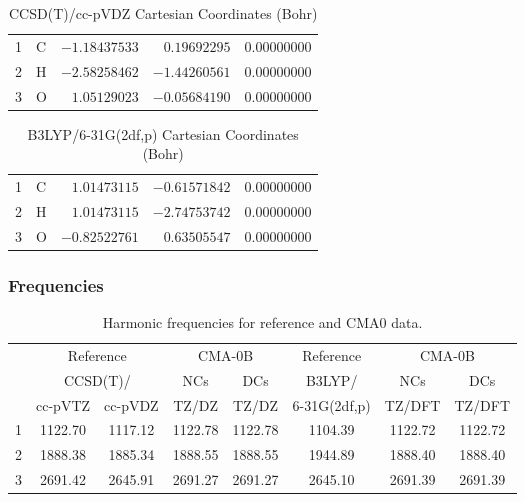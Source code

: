 \documentclass[10pt,oneside]{article}
\begin{document}
\begin{table}[h!]
\centering
\caption{CCSD(T)/cc-pVDZ Cartesian Coordinates (Bohr)}
\begin{tabular}{llrrr}
1  & C  & $-1.18437533$ & $ 0.19692295$ & $ 0.00000000$ \\
2  & H  & $-2.58258462$ & $-1.44260561$ & $ 0.00000000$ \\
3  & O  & $ 1.05129023$ & $-0.05684190$ & $ 0.00000000$ \\
\end{tabular}
\end{table}

\begin{table}[h!]
\centering
\caption{B3LYP/6-31G(2df,p) Cartesian Coordinates (Bohr)}
\begin{tabular}{llrrr}
1  & C  & $ 1.01473115$ & $-0.61571842$ & $ 0.00000000$ \\
2  & H  & $ 1.01473115$ & $-2.74753742$ & $ 0.00000000$ \\
3  & O  & $-0.82522761$ & $ 0.63505547$ & $ 0.00000000$ \\
\end{tabular}
\end{table}

\clearpage

\subsubsection*{Frequencies}
\begin{table}[h!]
\centering
\caption{Harmonic frequencies for reference and CMA0 data.}
\begin{tabular}{cccccccc}
\toprule
{} & \multicolumn{2}{c}{Reference} & \multicolumn{2}{c}{CMA-0B} &    Reference & \multicolumn{2}{c}{CMA-0B} \\
{} & \multicolumn{2}{c}{CCSD(T)/} &     NCs &     DCs &       B3LYP/ &     NCs &     DCs \\
{} &   cc-pVTZ & cc-pVDZ &   TZ/DZ &   TZ/DZ & 6-31G(2df,p) &  TZ/DFT &  TZ/DFT \\
\midrule
1 &   1122.70 & 1117.12 & 1122.78 & 1122.78 &      1104.39 & 1122.72 & 1122.72 \\
2 &   1888.38 & 1885.34 & 1888.55 & 1888.55 &      1944.89 & 1888.40 & 1888.40 \\
3 &   2691.42 & 2645.91 & 2691.27 & 2691.27 &      2645.10 & 2691.39 & 2691.39 \\
\bottomrule
\end{tabular}
\end{table}
\end{document}
